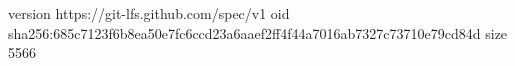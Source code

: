 version https://git-lfs.github.com/spec/v1
oid sha256:685c7123f6b8ea50e7fc6ccd23a6aaef2ff4f44a7016ab7327c73710e79cd84d
size 5566
